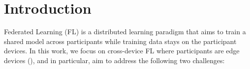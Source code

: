 \documentclass[twoside]{article}
\newcommand{\john}[1]{\todo[color=yellow!20,size=\footnotesize,inline,caption={}]{JN: #1}{}}
\newcommand{\mike}[1]{\todo[color=blue!20,size=\footnotesize,inline,caption={}]{MR: #1}{}}
\begin{document}
\section{Introduction}
\label{sec:intro}
Federated Learning (FL) is a distributed learning paradigm that aims to train a shared model across participants while training data stays on the participant devices. In this work, we focus on cross-device FL where participants are edge devices (\cite{fl-survey}), and in particular, aim to address the following two challenges:


\end{document}
